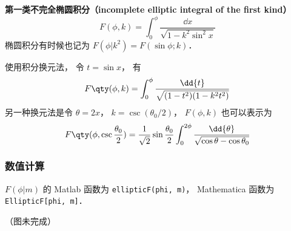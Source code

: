 

\textbf{第一类不完全椭圆积分（incomplete elliptic integral of the first kind）}
\begin{equation}\label{EliInt_eq1}
F(\phi, k) = \int_0^\phi \frac{\dd{x}}{\sqrt{1 - k^2\sin^2 x}}
\end{equation}
椭圆积分有时候也记为 $F(\phi | k^2) = F(\sin\phi ; k)$．

使用积分换元法， 令 $t = \sin x$， 有
\begin{equation}
F\qty(\phi, k) = \int_0^\phi \frac{\dd{t}}{\sqrt{(1 - t^2)(1 - k^2 t^2)}}
\end{equation}
另一种换元法是令 $\theta = 2x$， $k = \csc(\theta_0/2)$， $F(\phi, k)$ 也可以表示为
\begin{equation}\label{EliInt_eq2}
F\qty(\phi, \csc\frac{\theta_0}{2}) = \frac{1}{\sqrt{2}} \sin\frac{\theta_0}{2} \int_0^{2\phi} \frac{\dd{\theta}}{\sqrt{\cos\theta - \cos\theta_0}}
\end{equation}

\subsubsection{数值计算}
$F(\phi | m)$ 的 Matlab 函数为 \verb|ellipticF(phi, m)|， %
Mathematica 函数为 \verb|EllipticF[phi, m]|．

（图未完成）
